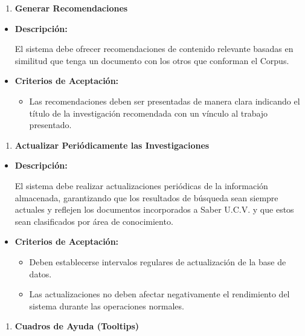 \documentclass[
  12pt,
  openany]{book}
\providecommand{\tightlist}{%
  \setlength{\itemsep}{0pt}\setlength{\parskip}{0pt}}
\begin{document}
\begin{enumerate}
\def\labelenumi{\arabic{enumi}.}
\setcounter{enumi}{5}
\tightlist
\item
  \textbf{Generar Recomendaciones}
\end{enumerate}

\begin{itemize}
\item
  \textbf{Descripción:}

  El sistema debe ofrecer recomendaciones de contenido relevante basadas en similitud que tenga un documento con los otros que conforman el Corpus.
\item
  \textbf{Criterios de Aceptación:}

  \begin{itemize}
  \tightlist
  \item
    Las recomendaciones deben ser presentadas de manera clara indicando el título de la investigación recomendada con un vínculo al trabajo presentado.
  \end{itemize}
\end{itemize}

\begin{enumerate}
\def\labelenumi{\arabic{enumi}.}
\setcounter{enumi}{6}
\tightlist
\item
  \textbf{Actualizar Periódicamente las Investigaciones}
\end{enumerate}

\begin{itemize}
\item
  \textbf{Descripción:}

  El sistema debe realizar actualizaciones periódicas de la información almacenada, garantizando que los resultados de búsqueda sean siempre actuales y reflejen los documentos incorporados a Saber U.C.V. y que estos sean clasificados por área de conocimiento.
\item
  \textbf{Criterios de Aceptación:}

  \begin{itemize}
  \item
    Deben establecerse intervalos regulares de actualización de la base de datos.
  \item
    Las actualizaciones no deben afectar negativamente el rendimiento del sistema durante las operaciones normales.
  \end{itemize}
\end{itemize}

\begin{enumerate}
\def\labelenumi{\arabic{enumi}.}
\setcounter{enumi}{7}
\tightlist
\item
  \textbf{Cuadros de Ayuda (Tooltips)}
\end{enumerate}
\end{document}
